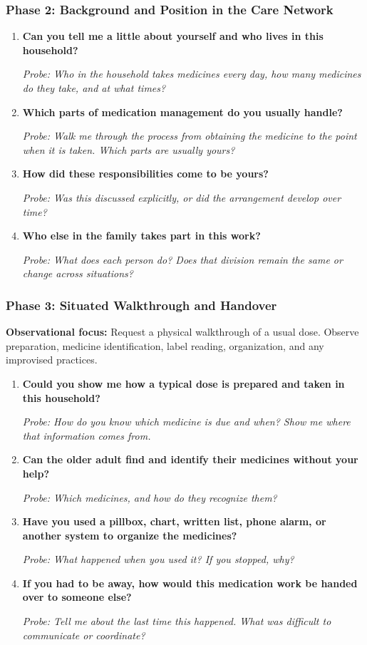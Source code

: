 \subsubsection{Phase 2: Background and Position in the Care Network}

\begin{enumerate}
  \item \textbf{Can you tell me a little about yourself and who lives in this household?}

  \textit{Probe: Who in the household takes medicines every day, how many medicines do they take, and at what times?}
  \item \textbf{Which parts of medication management do you usually handle?}

  \textit{Probe: Walk me through the process from obtaining the medicine to the point when it is taken. Which parts are usually yours?}
  \item \textbf{How did these responsibilities come to be yours?}

  \textit{Probe: Was this discussed explicitly, or did the arrangement develop over time?}
  \item \textbf{Who else in the family takes part in this work?}

  \textit{Probe: What does each person do? Does that division remain the same or change across situations?}
\end{enumerate}

\subsubsection{Phase 3: Situated Walkthrough and Handover}

\textbf{Observational focus:} Request a physical walkthrough of a usual dose. Observe preparation, medicine identification, label reading, organization, and any improvised practices.

\begin{enumerate}[resume]
  \item \textbf{Could you show me how a typical dose is prepared and taken in this household?}

  \textit{Probe: How do you know which medicine is due and when? Show me where that information comes from.}
  \item \textbf{Can the older adult find and identify their medicines without your help?}

  \textit{Probe: Which medicines, and how do they recognize them?}
  \item \textbf{Have you used a pillbox, chart, written list, phone alarm, or another system to organize the medicines?}

  \textit{Probe: What happened when you used it? If you stopped, why?}
  \item \textbf{If you had to be away, how would this medication work be handed over to someone else?}

  \textit{Probe: Tell me about the last time this happened. What was difficult to communicate or coordinate?}
\end{enumerate}

